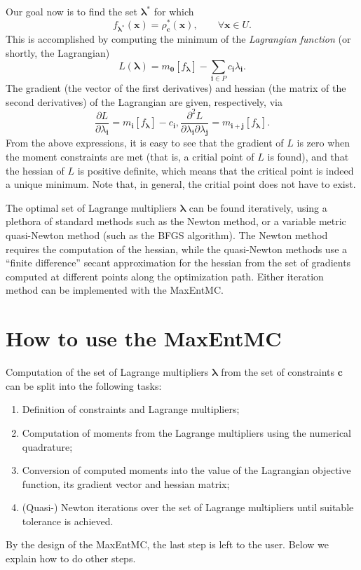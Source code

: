 \documentclass[12pt]{amsart}
\numberwithin{equation}{section}
\newcommand\BS{\boldsymbol}
\newcommand\parderiv[2]{\frac{\partial #1}{\partial #2}}
\begin{document}
Our goal now is to find the set $\BS\lambda^*$ for which
%
\begin{equation}
f_{\BS\lambda^*}(\BS x)=\rho_{\BS c}^*(\BS x), \qquad\forall\BS x\in
U.
\end{equation}
%
This is accomplished by computing the minimum of the {\em Lagrangian
  function} (or shortly, the Lagrangian)
%
\begin{equation}
\label{eq:lagrangian}
L(\BS\lambda)=m_{\BS 0}[f_{\BS\lambda}]-\sum_{\BS i\in
  P}c_{\BS i}\lambda_{\BS i}.
\end{equation}
%
The gradient (the vector of the first derivatives) and hessian (the
matrix of the second derivatives) of the Lagrangian are given,
respectively, via
%
\begin{subequations}
\begin{equation}
\parderiv L{\lambda_{\BS i}}=m_{\BS i}[f_{\BS\lambda}]-c_{\BS i},
\end{equation}
\begin{equation}
\parderiv{^2 L}{\lambda_{\BS i}\partial\lambda_{\BS j}}=m_{\BS i+\BS
  j}[f_{\BS\lambda}].
\end{equation}
\end{subequations}
%
From the above expressions, it is easy to see that the gradient of $L$
is zero when the moment constraints are met (that is, a critial point
of $L$ is found), and that the hessian of $L$ is positive definite,
which means that the critical point is indeed a unique minimum. Note
that, in general, the critial point does not have to exist.

The optimal set of Lagrange multipliers $\BS\lambda$ can be found
iteratively, using a plethora of standard methods such as the Newton
method, or a variable metric quasi-Newton method (such as the BFGS
algorithm). The Newton method requires the computation of the hessian,
while the quasi-Newton methods use a ``finite difference'' secant
approximation for the hessian from the set of gradients computed at
different points along the optimization path. Either iteration method
can be implemented with the MaxEntMC.

\section{How to use the MaxEntMC}

Computation of the set of Lagrange multipliers $\BS\lambda$ from the
set of constraints $\BS c$ can be split into the following tasks:
%
\begin{enumerate}
\item Definition of constraints and Lagrange multipliers;
\item Computation of moments from the Lagrange multipliers using the
  numerical quadrature;
\item Conversion of computed moments into the value of the Lagrangian
  objective function, its gradient vector and hessian matrix;
\item (Quasi-) Newton iterations over the set of Lagrange multipliers
  until suitable tolerance is achieved.
\end{enumerate}
%
By the design of the MaxEntMC, the last step is left to the
user. Below we explain how to do other steps.
\end{document}
